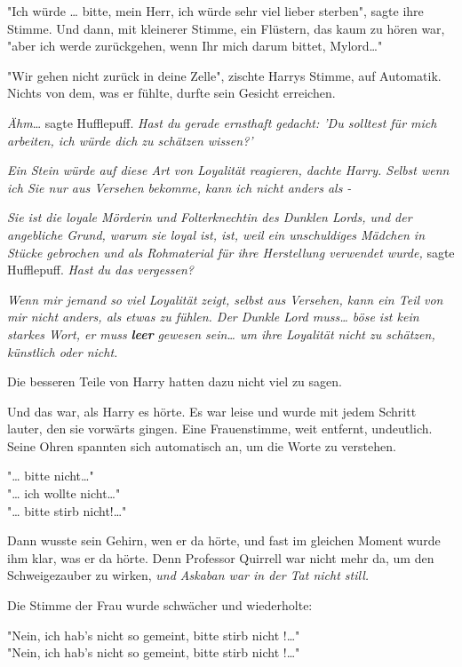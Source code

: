 {"Ich würde … bitte, mein Herr, ich würde sehr viel lieber sterben", sagte ihre Stimme. Und dann, mit kleinerer Stimme, ein Flüstern, das kaum zu hören war,\\ "aber ich werde zurückgehen, wenn Ihr mich darum bittet, Mylord…"

"Wir gehen nicht zurück in deine Zelle", zischte Harrys Stimme, auf Automatik. Nichts von dem, was er fühlte, durfte sein Gesicht erreichen.

\emph{Ähm}… sagte Hufflepuff. \emph{Hast du gerade ernsthaft gedacht: 'Du solltest für mich arbeiten, ich würde dich zu schätzen wissen?'}

\emph{Ein Stein würde auf diese Art von Loyalität reagieren, dachte Harry. Selbst wenn ich Sie nur aus Versehen bekomme, kann ich nicht anders als -}

\emph{Sie ist die loyale Mörderin und Folterknechtin des Dunklen Lords, und der angebliche Grund, warum sie loyal ist, ist, weil ein unschuldiges Mädchen in Stücke gebrochen und als Rohmaterial für ihre Herstellung verwendet wurde,} sagte Hufflepuff. \emph{Hast du das vergessen?}

\emph{Wenn mir jemand so viel Loyalität zeigt, selbst aus Versehen, kann ein Teil von mir nicht anders, als etwas zu fühlen. Der Dunkle Lord muss… böse ist kein starkes Wort, er muss} \textbf{\emph{leer}} \emph{gewesen sein… um ihre Loyalität nicht zu schätzen, künstlich oder nicht.}

Die besseren Teile von Harry hatten dazu nicht viel zu sagen.

Und das war, als Harry es hörte. Es war leise und wurde mit jedem Schritt lauter, den sie vorwärts gingen. Eine Frauenstimme, weit entfernt, undeutlich. Seine Ohren spannten sich automatisch an, um die Worte zu verstehen.

"… bitte nicht…"\\ "… ich wollte nicht…"\\ "… bitte stirb nicht!…"

Dann wusste sein Gehirn, wen er da hörte, und fast im gleichen Moment wurde ihm klar, was er da hörte. Denn Professor Quirrell war nicht mehr da, um den Schweigezauber zu wirken, \emph{und Askaban war in der Tat nicht still.}

Die Stimme der Frau wurde schwächer und wiederholte:

"Nein, ich hab's nicht so gemeint, bitte stirb nicht !…"\\ "Nein, ich hab's nicht so gemeint, bitte stirb nicht !…"

}
